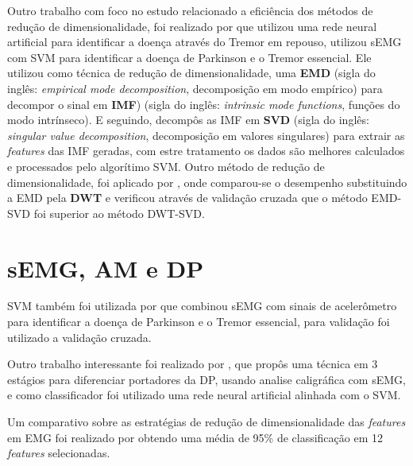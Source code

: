 Outro trabalho com foco no estudo relacionado a eficiência dos métodos de redução de dimensionalidade, foi realizado por  que utilizou uma rede neural artificial para identificar a doença através do Tremor em repouso,  utilizou sEMG com SVM para identificar a doença de Parkinson e o Tremor essencial. Ele utilizou como técnica de redução de dimensionalidade, uma \textbf{EMD} (sigla do inglês: \textit{empirical mode decomposition}, decomposição em modo empírico) para decompor o sinal em \textbf{IMF}) (sigla do inglês: \textit{intrinsic mode functions}, funções do modo intrínseco). E seguindo, decompôs as IMF em \textbf{SVD} (sigla do inglês: \textit{singular value decomposition}, decomposição em valores singulares) para extrair as \textit{features} das IMF geradas, com estre tratamento os dados são melhores calculados e processados pelo algorítimo SVM. Outro método de redução de dimensionalidade, foi aplicado por , onde comparou-se o desempenho substituindo a EMD pela \textbf{DWT} e verificou através de validação cruzada que o método EMD-SVD foi superior ao método DWT-SVD.

\section{sEMG, AM e DP}
SVM também foi utilizada por \cite{kugler2013automated} que combinou sEMG com sinais de acelerômetro para identificar a doença de Parkinson e o Tremor essencial, para validação foi utilizado a validação cruzada.

Outro trabalho interessante foi realizado por \cite{loconsole2018model}, que propôs uma técnica em 3 estágios para diferenciar portadores da DP, usando analise caligráfica com sEMG, e como classificador foi utilizado uma rede neural artificial alinhada com o SVM.

Um comparativo sobre as estratégias de redução de dimensionalidade das \textit{features} em EMG foi realizado por \cite{liu2014feature} obtendo uma média de 95\% de classificação em 12 \textit{features} selecionadas. 